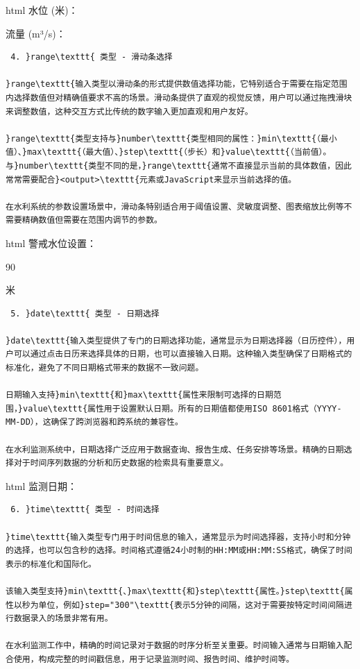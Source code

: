 html 水位 (米)：

流量 (m³/s)：

\begin{lstlisting}
 4. }range\texttt{ 类型 - 滑动条选择

}range\texttt{输入类型以滑动条的形式提供数值选择功能，它特别适合于需要在指定范围内选择数值但对精确值要求不高的场景。滑动条提供了直观的视觉反馈，用户可以通过拖拽滑块来调整数值，这种交互方式比传统的数字输入更加直观和用户友好。

}range\texttt{类型支持与}number\texttt{类型相同的属性：}min\texttt{（最小值）、}max\texttt{（最大值）、}step\texttt{（步长）和}value\texttt{（当前值）。与}number\texttt{类型不同的是，}range\texttt{通常不直接显示当前的具体数值，因此常常需要配合}<output>\texttt{元素或JavaScript来显示当前选择的值。

在水利系统的参数设置场景中，滑动条特别适合用于阈值设置、灵敏度调整、图表缩放比例等不需要精确数值但需要在范围内调节的参数。
\end{lstlisting}

html 警戒水位设置：

90

米

\begin{lstlisting}
 5. }date\texttt{ 类型 - 日期选择

}date\texttt{输入类型提供了专门的日期选择功能，通常显示为日期选择器（日历控件），用户可以通过点击日历来选择具体的日期，也可以直接输入日期。这种输入类型确保了日期格式的标准化，避免了不同日期格式带来的数据不一致问题。

日期输入支持}min\texttt{和}max\texttt{属性来限制可选择的日期范围，}value\texttt{属性用于设置默认日期。所有的日期值都使用ISO 8601格式（YYYY-MM-DD），这确保了跨浏览器和跨系统的兼容性。

在水利监测系统中，日期选择广泛应用于数据查询、报告生成、任务安排等场景。精确的日期选择对于时间序列数据的分析和历史数据的检索具有重要意义。
\end{lstlisting}

html 监测日期：

\begin{lstlisting}
 6. }time\texttt{ 类型 - 时间选择

}time\texttt{输入类型专门用于时间信息的输入，通常显示为时间选择器，支持小时和分钟的选择，也可以包含秒的选择。时间格式遵循24小时制的HH:MM或HH:MM:SS格式，确保了时间表示的标准化和国际化。

该输入类型支持}min\texttt{、}max\texttt{和}step\texttt{属性。}step\texttt{属性以秒为单位，例如}step="300"\texttt{表示5分钟的间隔，这对于需要按特定时间间隔进行数据录入的场景非常有用。

在水利监测工作中，精确的时间记录对于数据的时序分析至关重要。时间输入通常与日期输入配合使用，构成完整的时间戳信息，用于记录监测时间、报告时间、维护时间等。
\end{lstlisting}

